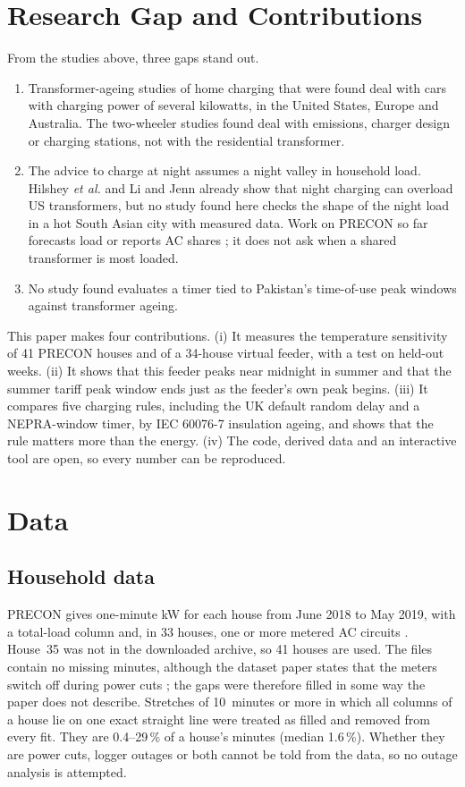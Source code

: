 \documentclass[conference]{IEEEtran}
\begin{document}
\section{Research Gap and Contributions}
From the studies above, three gaps stand out.
\begin{enumerate}
\item Transformer-ageing studies of home charging that were found deal with
cars with charging power of several kilowatts, in the United States, Europe
and Australia. The two-wheeler studies found deal with emissions, charger
design or charging stations, not with the residential transformer.
\item The advice to charge at night assumes a night valley in household
load. Hilshey \emph{et al.} \cite{hilshey2013} and Li and Jenn \cite{lijenn2024}
already show that night charging can overload US transformers, but no study
found here checks the shape of the night load in a hot South Asian city with
measured data. Work on PRECON so far forecasts load or reports AC shares
\cite{nadeem2020,bajwa2026}; it does not ask when a shared transformer is most
loaded.
\item No study found evaluates a timer tied to Pakistan's time-of-use peak
windows \cite{nepra2026} against transformer ageing.
\end{enumerate}

This paper makes four contributions. (i) It measures the temperature
sensitivity of 41 PRECON houses and of a 34-house virtual feeder, with a test
on held-out weeks. (ii) It shows that this feeder peaks near midnight in
summer and that the summer tariff peak window ends just as the feeder's own
peak begins. (iii) It compares five charging rules, including the UK default
random delay and a NEPRA-window timer, by IEC 60076-7 insulation ageing, and
shows that the rule matters more than the energy. (iv) The code, derived data
and an interactive tool are open, so every number can be reproduced.

\section{Data}
\subsection{Household data}
PRECON gives one-minute kW for each house from June 2018 to May 2019, with a
total-load column and, in 33 houses, one or more metered AC circuits
\cite{precon}. House~35 was not in the downloaded archive, so 41 houses are
used. The files contain no missing minutes, although the dataset paper states
that the meters switch off during power cuts \cite{precon}; the gaps were
therefore filled in some way the paper does not describe. Stretches of
10~minutes or more in which all columns of a house lie on one exact straight
line were treated as filled and removed from every fit. They are
0.4--29\,\% of a house's minutes (median 1.6\,\%). Whether they are power
cuts, logger outages or both cannot be told from the data, so no outage
analysis is attempted.
\end{document}
